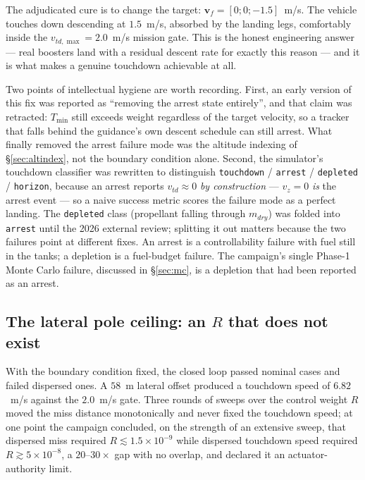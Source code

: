 \documentclass[11pt]{article}
\newcommand{\vvec}{\mathbf{v}}
\newcommand{\Tmin}{T_{\min}}
\begin{document}
The adjudicated cure is to change the target: $\vvec_f = [0;0;-1.5]$~m/s.
The vehicle touches down descending at $1.5$~m/s, absorbed by the landing
legs, comfortably inside the $v_{td,\max} = 2.0$~m/s mission gate. This is
the honest engineering answer --- real boosters land with a residual descent
rate for exactly this reason --- and it is what makes a genuine touchdown
achievable at all.

Two points of intellectual hygiene are worth recording. First, an early
version of this fix was reported as ``removing the arrest state entirely'',
and that claim was retracted: $\Tmin$ still exceeds weight regardless of the
target velocity, so a tracker that falls behind the guidance's own descent
schedule can still arrest. What finally removed the arrest failure mode was
the altitude indexing of \S\ref{sec:altindex}, not the boundary condition
alone. Second, the simulator's touchdown classifier was rewritten to
distinguish \texttt{touchdown} / \texttt{arrest} / \texttt{depleted} /
\texttt{horizon}, because
an arrest reports $v_{td} \approx 0$ \emph{by construction} --- $v_z = 0$
\emph{is} the arrest event --- so a naive success metric scores the failure
mode as a perfect landing. The \texttt{depleted} class (propellant falling
through $m_{dry}$) was folded into \texttt{arrest} until the 2026 external
review; splitting it out matters because the two failures point at
different fixes. An arrest is a controllability failure with fuel still in
the tanks; a depletion is a fuel-budget failure. The campaign's single
Phase-1 Monte Carlo failure, discussed in \S\ref{sec:mc}, is a depletion
that had been reported as an arrest.

\subsection{The lateral pole ceiling: an $R$ that does not exist}
\label{sec:pole}

With the boundary condition fixed, the closed loop passed nominal cases and
failed dispersed ones. A $58$~m lateral offset produced a touchdown speed of
$6.82$~m/s against the $2.0$~m/s gate. Three rounds of sweeps over the
control weight $R$ moved the miss distance monotonically and never fixed the
touchdown speed; at one point the campaign concluded, on the strength of an
extensive sweep, that dispersed miss required $R \lesssim 1.5\times10^{-9}$
while dispersed touchdown speed required $R \gtrsim 5\times10^{-8}$, a
$20$--$30\times$ gap with no overlap, and declared it an actuator-authority
limit.
\end{document}
